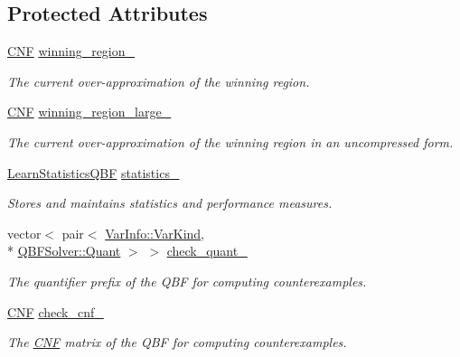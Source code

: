 \subsection*{Protected Attributes}
\begin{DoxyCompactItemize}
\item 
\hyperlink{classCNF}{C\-N\-F} \hyperlink{classLearnSynthQBFInc_abc3503bdb6be7053a7c3d3d7e57858d6}{winning\-\_\-region\-\_\-}
\begin{DoxyCompactList}\small\item\em The current over-\/approximation of the winning region. \end{DoxyCompactList}\item 
\hyperlink{classCNF}{C\-N\-F} \hyperlink{classLearnSynthQBFInc_a5ef45d9d77b566fca1c5a1e6041f7c86}{winning\-\_\-region\-\_\-large\-\_\-}
\begin{DoxyCompactList}\small\item\em The current over-\/approximation of the winning region in an uncompressed form. \end{DoxyCompactList}\item 
\hyperlink{classLearnStatisticsQBF}{Learn\-Statistics\-Q\-B\-F} \hyperlink{classLearnSynthQBFInc_a1f8d3bd97419754ef72759bdda766db4}{statistics\-\_\-}
\begin{DoxyCompactList}\small\item\em Stores and maintains statistics and performance measures. \end{DoxyCompactList}\item 
vector$<$ pair$<$ \hyperlink{classVarInfo_a64d1da76cf84fe674e5fef9764ef11cf}{Var\-Info\-::\-Var\-Kind}, \\*
\hyperlink{classQBFSolver_ac091e263cb55286cc07b2451bcf4d3c7}{Q\-B\-F\-Solver\-::\-Quant} $>$ $>$ \hyperlink{classLearnSynthQBFInc_a1430ac66d026f9e3f30619082f378426}{check\-\_\-quant\-\_\-}
\begin{DoxyCompactList}\small\item\em The quantifier prefix of the Q\-B\-F for computing counterexamples. \end{DoxyCompactList}\item 
\hyperlink{classCNF}{C\-N\-F} \hyperlink{classLearnSynthQBFInc_ac0ab1f2bc45740dc3e3e28e04a98d62d}{check\-\_\-cnf\-\_\-}
\begin{DoxyCompactList}\small\item\em The \hyperlink{classCNF}{C\-N\-F} matrix of the Q\-B\-F for computing counterexamples. \end{DoxyCompactList}\item 

\end{DoxyCompactItemize}
